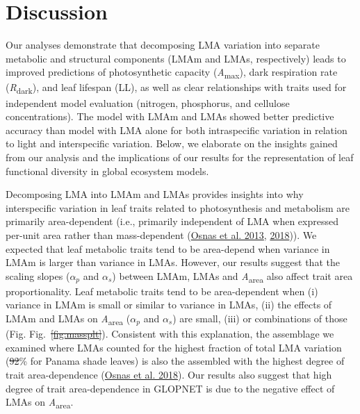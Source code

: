 \documentclass[
  12pt,
  a4paper,
,tablecaptionabove
]{scrartcl}
\providecommand{\DIFaddtex}[1]{{\protect\color{blue}\uwave{#1}}} %
\providecommand{\DIFdeltex}[1]{{\protect\color{red}\sout{#1}}}                      %
\providecommand{\DIFaddbegin}{} %
\providecommand{\DIFaddend}{} %
\providecommand{\DIFdelbegin}{} %
\providecommand{\DIFdelend}{} %
\providecommand{\DIFadd}[1]{\texorpdfstring{\DIFaddtex{#1}}{#1}} %
\providecommand{\DIFdel}[1]{\texorpdfstring{\DIFdeltex{#1}}{}} %
\newcommand{\DIFscaledelfig}{0.5}
\newlength{\DIFdelgraphicswidth} %
\newlength{\DIFdelgraphicsheight} %
\newcommand{\DIFaddincludegraphics}[2][]{{\color{blue}\fbox{\DIFOincludegraphics[#1]{#2}}}} %
\newcommand{\DIFdelincludegraphics}[2][]{%
\sbox{\DIFdelgraphicsbox}{\DIFOincludegraphics[#1]{#2}}%
\settoboxwidth{\DIFdelgraphicswidth}{\DIFdelgraphicsbox} %
\settoboxtotalheight{\DIFdelgraphicsheight}{\DIFdelgraphicsbox} %
\scalebox{\DIFscaledelfig}{%
\parbox[b]{\DIFdelgraphicswidth}{\usebox{\DIFdelgraphicsbox}\\[-\baselineskip] \rule{\DIFdelgraphicswidth}{0em}}\llap{\resizebox{\DIFdelgraphicswidth}{\DIFdelgraphicsheight}{%
\setlength{\unitlength}{\DIFdelgraphicswidth}%
\begin{picture}(1,1)%
\thicklines\linethickness{2pt} %
{\color[rgb]{1,0,0}\put(0,0){\framebox(1,1){}}}%
{\color[rgb]{1,0,0}\put(0,0){\line( 1,1){1}}}%
{\color[rgb]{1,0,0}\put(0,1){\line(1,-1){1}}}%
\end{picture}%
}\hspace*{3pt}}} %
} %
\DeclareRobustCommand{\DIFaddbegin}{\DIFOaddbegin \let\includegraphics\DIFaddincludegraphics} %
\DeclareRobustCommand{\DIFaddend}{\DIFOaddend \let\includegraphics\DIFOincludegraphics} %
\DeclareRobustCommand{\DIFdelbegin}{\DIFOdelbegin \let\includegraphics\DIFdelincludegraphics} %
\DeclareRobustCommand{\DIFdelend}{\DIFOaddend \let\includegraphics\DIFOincludegraphics} %
\begin{document}
\hypertarget{discussion}{%
\section{Discussion}\label{discussion}}

Our analyses demonstrate that decomposing LMA variation into separate
metabolic and structural components (LMAm and LMAs, respectively) leads
to improved predictions of photosynthetic capacity
(\emph{A}\textsubscript{max}), dark respiration rate
(\emph{R}\textsubscript{dark}), and leaf lifespan (LL), as well as clear
relationships with traits used for independent model evaluation
(nitrogen, phosphorus, and cellulose concentrations). The model with
LMAm and LMAs showed better predictive accuracy than model with LMA
alone for both intraspecific variation in relation to light and
interspecific variation. Below, we elaborate on the insights gained from
our analysis and the implications of our results for the representation
of leaf functional diversity in global ecosystem models.

Decomposing LMA into LMAm and LMAs provides insights into why
interspecific variation in leaf traits related to photosynthesis and
metabolism are primarily area-dependent (i.e., primarily independent of
LMA when expressed per-unit area rather than mass-dependent
(\protect\hyperlink{ref-Osnas2013}{Osnas et al. 2013},
\protect\hyperlink{ref-Osnas2018}{2018})). We expected that leaf
metabolic traits tend to be area-depend when variance in LMAm is larger
than variance in LMAs. However, our results suggest that the scaling
slopes (\(\alpha_p\) and \(\alpha_s\)) between LMAm, LMAs and
\emph{A}\textsubscript{area} also affect trait area proportionality.
Leaf metabolic traits tend to be area-dependent when (i) variance in
LMAm is small or similar to variance in LMAs, (ii) the effects of LMAm
and LMAs on \emph{A}\textsubscript{area} (\(\alpha_p\) and \(\alpha_s\))
are small, (iii) or combinations of those (Fig. Fig.~\DIFdelbegin \DIFdel{\ref{fig:massplt}}\DIFdelend \DIFaddbegin \DIFadd{\ref{fig-massplt}}\DIFaddend ).
Consistent with this explanation, the assemblage we examined where LMAs
counted for the highest fraction of total LMA variation (\DIFdelbegin \DIFdel{92}\DIFdelend \DIFaddbegin \DIFadd{92.3}\DIFaddend \% for
Panama shade leaves) is also the assembled with the highest degree of
trait area-dependence (\protect\hyperlink{ref-Osnas2018}{Osnas et al.
2018}). Our results also suggest that high degree of trait
area-dependence in GLOPNET is due to the negative effect of LMAs on
\emph{A}\textsubscript{area}.
\end{document}
